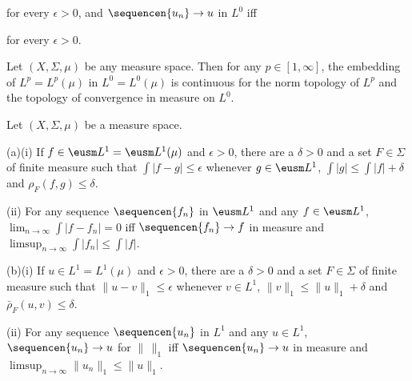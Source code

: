 
\noindent for every $\epsilon>0$, and $\sequencen{u_n}\to u$ in $L^0$
iff


\noindent for every $\epsilon>0$.

 Let
$(X,\Sigma,\mu)$ be any measure space.   Then for any $p\in[1,\infty]$,
the embedding of $L^p=L^p(\mu)$ in $L^0=L^0(\mu)$ is continuous for the
norm topology of $L^p$ and the topology of convergence in measure on
$L^0$.


 Let $(X,\Sigma,\mu)$ be a measure space.

(a)(i) If $f\in\eusm L^1=\eusm L^1(\mu)$ and $\epsilon>0$, there are a
$\delta>0$ and a set $F\in\Sigma$ of finite measure such that
$\int|f-g|\le\epsilon$ whenever $g\in\eusm L^1$,
$\int|g|\le\int|f|+\delta$ and $\rho_F(f,g)\le\delta$.

\quad(ii) For any sequence $\sequencen{f_n}$ in $\eusm L^1$ and any
$f\in\eusm L^1$, $\lim_{n\to\infty}\int|f-f_n|=0$ iff
$\sequencen{f_n}\to f$ in measure and
$\limsup_{n\to\infty}\int|f_n|\le\int|f|$.

(b)(i) If $u\in L^1=L^1(\mu)$ and $\epsilon>0$, there are a $\delta>0$
and a set $F\in\Sigma$ of finite measure such that
$\|u-v\|_1\le\epsilon$ whenever $v\in L^1$, $\|v\|_1\le\|u\|_1+\delta$
and $\bar\rho_F(u,v)\le\delta$.

\quad(ii) For any sequence $\sequencen{u_n}$ in $L^1$ and any $u\in
L^1$, $\sequencen{u_n}\to u$ for $\|\,\|_1$ iff $\sequencen{u_n}\to u$
in measure and $\limsup_{n\to\infty}\|u_n\|_1\le\|u\|_1$.

